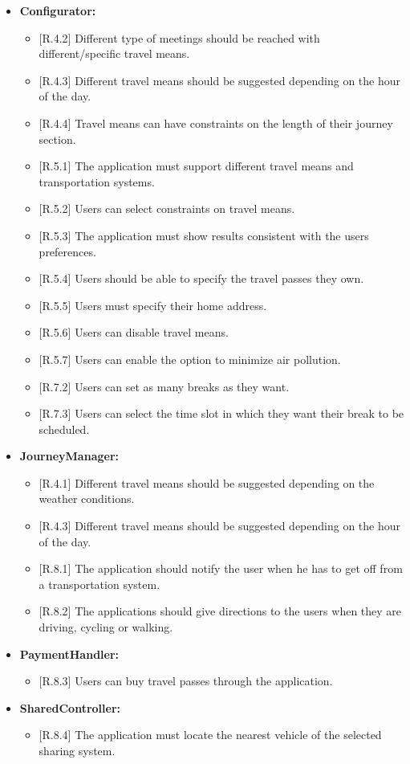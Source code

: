 \begin{itemize}
\item
\textbf{Configurator:}
\begin{itemize}
\item
$[$R.4.2$]$ Different type of meetings should be reached with different/specific travel means.
\item
$[$R.4.3$]$ Different travel means should be suggested depending on the hour of the day.
\item
$[$R.4.4$]$ Travel means can have constraints on the length of their journey section.
\item
$[$R.5.1$]$ The application must support different travel means and transportation systems.
\item
$[$R.5.2$]$ Users can select constraints on travel means.
\item
$[$R.5.3$]$ The application must show results consistent with the users preferences.
\item
$[$R.5.4$]$ Users should be able to specify the travel passes they own.
\item
$[$R.5.5$]$ Users must specify their home address.
\item
$[$R.5.6$]$ Users can disable travel means.
\item
$[$R.5.7$]$ Users can enable the option to minimize air pollution.
\item
$[$R.7.2$]$ Users can set as many breaks as they want.
\item
$[$R.7.3$]$ Users can select the time slot in which they want their break to be scheduled.
\end{itemize}

\item
\textbf{JourneyManager:}
\begin{itemize}
\item
$[$R.4.1$]$ Different travel means should be suggested depending on the weather conditions.
\item
$[$R.4.3$]$ Different travel means should be suggested depending on the hour of the day.
\item
$[$R.8.1$]$ The application should notify the user when he has to get off from a transportation system.
\item
$[$R.8.2$]$ The applications should give directions to the users when they are driving, cycling or walking.
\end{itemize}

\item
\textbf{PaymentHandler:}
\begin{itemize}
\item
$[$R.8.3$]$ Users can buy travel passes through the application.
\end{itemize}

\item
\textbf{SharedController:}
\begin{itemize}
\item
$[$R.8.4$]$ The application must locate the nearest vehicle of the selected sharing system.
\end{itemize}
\end{itemize}